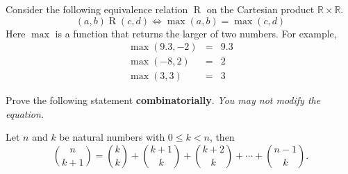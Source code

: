 \documentclass[10pt, addpoints]{exam}
\theoremstyle{definition}
\newcommand{\R}{\mathbb{R}}
\begin{document}
\begin{questions}
\begin{parts}
\end{parts}

\newpage
\question Consider the following equivalence relation $\mathrel{R}$ on the Cartesian product $\R\times \R$.
\[
(a, b) \mathrel{R} (c, d) \iff \max(a, b)=\max(c, d)
\]
Here $\max$ is a function that returns the larger of two numbers. For example,
\begin{eqnarray*}
\max(9.3, -2) &=& 9.3\\
\max(-8, 2) &=& 2\\
\max(3, 3) &=& 3
\end{eqnarray*}




\newpage
\question[8]
Prove the following statement {\bf combinatorially}. \textit{You may not modify the equation.}

Let $n$ and $k$ be natural numbers with $0\leq k<n$, then 
\[
\binom{n}{k+1} = \binom{k}{k} + \binom{k+1}{k} + \binom{k+2}{k} + \cdots + \binom{n-1}{k}.
\]
%
\end{questions}




%
\newpage
\end{document}

